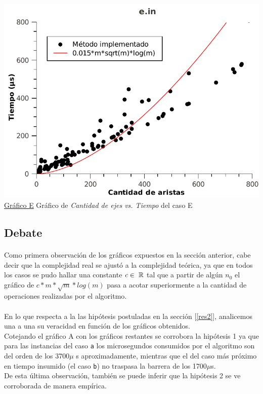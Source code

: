 \begin{center}
\vspace*{1.5cm}
\hspace*{-2.1cm}\includegraphics[scale = 0.9]{../ej2/pruebas_graficos/GraphE.pdf} \\
\underline{Gráfico E} Gráfico de \textit{Cantidad de ejes vs. Tiempo} del caso E
\end{center}

\clearpage 


\subsection{Debate}
\label{deb2}

\paragraph{}
Como primera observación de los gráficos expuestos en la sección anterior, cabe decir que la complejidad real se ajustó a la complejidad teórica, ya que en todos los casos se pudo hallar una constante $c \in\ \mathbb{R}$ tal que a partir de algún $n_0$ el gráfico de $c*m*\sqrt{m}*log(m)$ pasa a acotar superiormente a la cantidad de operaciones realizadas por el algoritmo.

\paragraph{}
En lo que respecta a la las hipótesis postuladas en la sección [\ref{res2}], analicemos una a una su veracidad en función de los gráficos obtenidos.\\
Cotejando el gráfico A con los gráficos restantes se corrobora la hipótesis 1 ya que para las instancias del caso \texttt{a} los microsegundos consumidos por el algoritmo son del orden de los 3700$\mu$ s aproximadamente, mientras que el del caso más próximo en tiempo insumido (el caso \texttt{b}) no traspasa la barrera de los 1700$\mu$s.\\
De esta última observación, también se puede inferir que la hipótesis 2 se ve corroborada de manera empírica.

